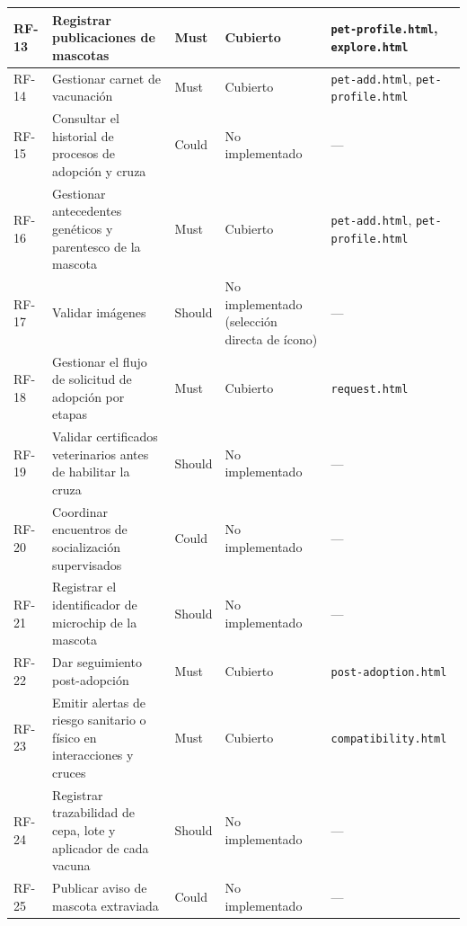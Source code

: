 \documentclass[journal,onecolumn]{IEEEtran}
\begin{document}
\begin{longtable}{@{}p{1.5cm} p{5.2cm} p{1.7cm} p{3.0cm} p{3.4cm}@{}}
		\hline
		RF-13 & Registrar publicaciones de mascotas & Must & Cubierto & \texttt{pet-profile.html}, \texttt{explore.html} \\
		\hline
		RF-14 & Gestionar carnet de vacunación & Must & Cubierto & \texttt{pet-add.html}, \texttt{pet-profile.html} \\
		\hline
		RF-15 & Consultar el historial de procesos de adopción y cruza & Could & No implementado & --- \\
		\hline
		RF-16 & Gestionar antecedentes genéticos y parentesco de la mascota & Must & Cubierto & \texttt{pet-add.html}, \texttt{pet-profile.html} \\
		\hline
		RF-17 & Validar imágenes & Should & No implementado (selección directa de ícono) & --- \\
		\hline
		RF-18 & Gestionar el flujo de solicitud de adopción por etapas & Must & Cubierto & \texttt{request.html} \\
		\hline
		RF-19 & Validar certificados veterinarios antes de habilitar la cruza & Should & No implementado & --- \\
		\hline
		RF-20 & Coordinar encuentros de socialización supervisados & Could & No implementado & --- \\
		\hline
		RF-21 & Registrar el identificador de microchip de la mascota & Should & No implementado & --- \\
		\hline
		RF-22 & Dar seguimiento post-adopción & Must & Cubierto & \texttt{post-adoption.html} \\
		\hline
		RF-23 & Emitir alertas de riesgo sanitario o físico en interacciones y cruces & Must & Cubierto & \texttt{compatibility.html} \\
		\hline
		RF-24 & Registrar trazabilidad de cepa, lote y aplicador de cada vacuna & Should & No implementado & --- \\
		\hline
		RF-25 & Publicar aviso de mascota extraviada & Could & No implementado & --- \\
	\end{longtable}
	
\end{document}
